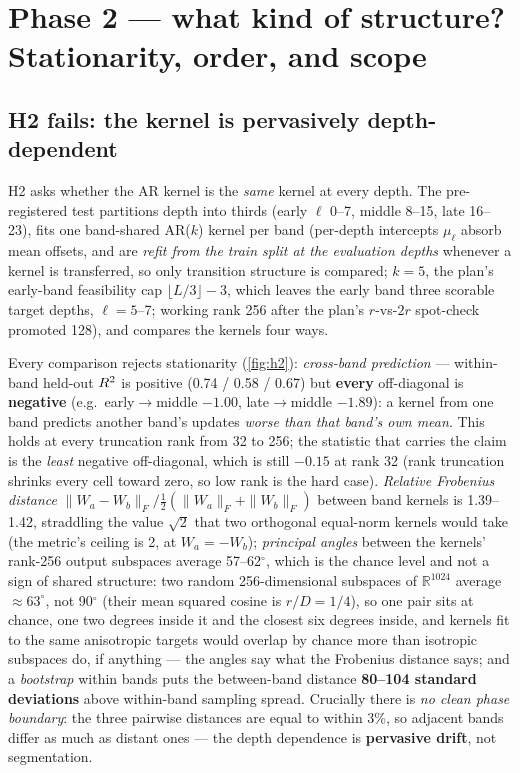 \section{Phase 2 --- what kind of structure? Stationarity, order, and scope}
\label{sec:phase2}

\subsection{H2 fails: the kernel is pervasively depth-dependent}
\label{sec:phase2:stationarity}

H2 asks whether the AR kernel is the \emph{same} kernel at every depth. The
pre-registered test partitions depth into thirds (early $\ell$ 0--7, middle
8--15, late 16--23), fits one band-shared AR($k$) kernel per band (per-depth
intercepts $\mu_\ell$ absorb mean offsets, and are \emph{refit from the train
split at the evaluation depths} whenever a kernel is transferred, so only
transition structure is compared; $k=5$, the plan's early-band feasibility cap
$\lfloor L/3 \rfloor - 3$, which leaves the early band three scorable target
depths, $\ell = 5$--7; working rank 256 after the plan's $r$-vs-$2r$
spot-check promoted 128), and compares the kernels four ways.

Every comparison rejects stationarity (\cref{fig:h2}):
\emph{cross-band prediction} --- within-band held-out $R^2$ is positive
(0.74 / 0.58 / 0.67) but \textbf{every} off-diagonal is \textbf{negative}
(e.g.\ early$\to$middle $-1.00$, late$\to$middle $-1.89$): a kernel from one
band predicts another band's updates \emph{worse than that band's own mean}.
This holds at every truncation rank from 32 to 256; the statistic that carries
the claim is the \emph{least} negative off-diagonal, which is still $-0.15$ at
rank 32 (rank truncation shrinks every cell toward zero, so low rank is the
hard case). \emph{Relative Frobenius distance}
$\|W_a - W_b\|_F / \tfrac12(\|W_a\|_F + \|W_b\|_F)$ between band kernels is
1.39--1.42, straddling the value $\sqrt 2$ that two orthogonal equal-norm
kernels would take (the metric's ceiling is 2, at $W_a = -W_b$);
\emph{principal angles} between the kernels' rank-256 output subspaces
average 57--62$^\circ$, which is the chance level and not a sign of shared
structure: two random 256-dimensional subspaces of $\mathbb{R}^{1024}$ average
${\approx}63^\circ$, not 90$^\circ$ (their mean squared cosine is
$r/D = 1/4$), so one pair sits at chance, one two degrees inside it and the
closest six degrees inside, and kernels fit to the same anisotropic targets
would overlap by chance more than isotropic subspaces do, if anything --- the
angles say what the Frobenius distance says; and a
\emph{bootstrap} within bands puts the between-band
distance \textbf{80--104 standard deviations} above within-band sampling
spread. Crucially there is \emph{no clean phase boundary}: the three pairwise
distances are equal to within 3\%, so adjacent bands differ as much as distant
ones --- the depth dependence is \textbf{pervasive drift}, not segmentation.

